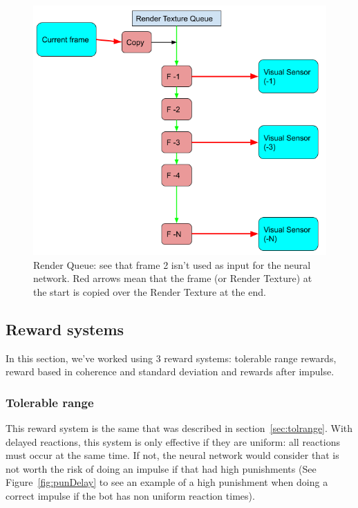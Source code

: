 \begin{figure}[h]
  \centering
		\includegraphics[width=.95\textwidth]{img/renderqueue.png}
  \caption{Render Queue: see that frame 2 isn't used as input for the neural network. Red arrows mean that the frame (or Render Texture) at the start is copied over the Render Texture at the end.}
  \label{fig:renderqueue}
\end{figure}

\subsection{Reward systems}
\label{sec:rtrewsys}

In this section, we've worked using 3 reward systems: tolerable range rewards, reward based in coherence and standard deviation and rewards after impulse.

\subsubsection{Tolerable range}

This reward system is the same that was described in section~\ref{sec:tolrange}. With delayed reactions, this system is only effective if they are uniform: all reactions must occur at the same time. If not, the neural network would consider that is not worth the risk of doing an impulse if that had high punishments (See Figure~\ref{fig:punDelay} to see an example of a high punishment when doing a correct impulse if the bot has non uniform reaction times).

